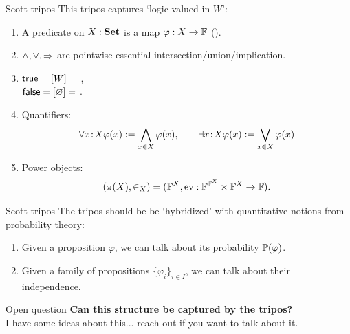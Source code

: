 \begin{frame}{Scott tripos}
	This tripos captures `logic valued in $W$':
	\vfill
	\begin{enumerate}
		\item A predicate on $X : \Set$ is a map $\varphi : X \to \alg F$ (\textit{}).
		\item $\land, \lor, \hey$ are pointwise essential intersection/union/implication.
		\item $\true = [W] = $ ,\\
		$\false = [\varnothing] =$ .
		\item Quantifiers:
		\begin{equation*}
			\forall x \tin X \varphi(x) := \bigwedge_{x \in X} \varphi(x), \qquad \exists x \tin X \varphi(x) := \bigvee_{x \in X} \varphi(x)
		\end{equation*}
		\item Power objects:
		\begin{equation*}
			(\pi(X), \in_X) = (\alg F^X, \ev : \alg F^{\alg F^X} \times \alg F^X \to \alg F).
		\end{equation*}
	\end{enumerate}
\end{frame}

\begin{frame}{Scott tripos}
	The tripos should be be `hybridized' with quantitative notions from probability theory:
	\vfill
	\begin{enumerate}
		\item Given a proposition $\varphi$, we can talk about its probability $\P(\varphi)$.
		\item Given a family of propositions $\{\varphi_i\}_{i \in I}$, we can talk about their independence.
	\end{enumerate}
	\vfill
	\begin{block}{Open question}
		\textbf{Can this structure be captured by the tripos?}\\
		I have some ideas about this... reach out if you want to talk about it.
	\end{block}
\end{frame}




